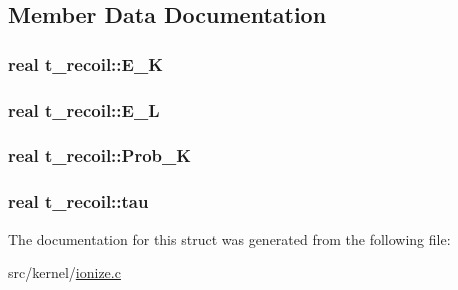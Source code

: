\subsection{\-Member \-Data \-Documentation}
\hypertarget{structt__recoil_adf6683000d97093f67fa9c6909e65c91}{
\subsubsection[{\-E\-\_\-\-K}]{\setlength{\rightskip}{0pt plus 5cm}real {\bf t\-\_\-recoil\-::\-E\-\_\-\-K}}}\label{structt__recoil_adf6683000d97093f67fa9c6909e65c91}
\hypertarget{structt__recoil_a9e248ac215b3793cd10935b635bd399b}{
\subsubsection[{\-E\-\_\-\-L}]{\setlength{\rightskip}{0pt plus 5cm}real {\bf t\-\_\-recoil\-::\-E\-\_\-\-L}}}\label{structt__recoil_a9e248ac215b3793cd10935b635bd399b}
\hypertarget{structt__recoil_a59b9ac6b5910e522f3950fc1100c59fb}{
\subsubsection[{\-Prob\-\_\-\-K}]{\setlength{\rightskip}{0pt plus 5cm}real {\bf t\-\_\-recoil\-::\-Prob\-\_\-\-K}}}\label{structt__recoil_a59b9ac6b5910e522f3950fc1100c59fb}
\hypertarget{structt__recoil_a3333b8572f8af2c07b2e144a7b07d724}{
\subsubsection[{tau}]{\setlength{\rightskip}{0pt plus 5cm}real {\bf t\-\_\-recoil\-::tau}}}\label{structt__recoil_a3333b8572f8af2c07b2e144a7b07d724}


\-The documentation for this struct was generated from the following file\-:\begin{DoxyCompactItemize}
\item 
src/kernel/\hyperlink{ionize_8c}{ionize.\-c}\end{DoxyCompactItemize}
